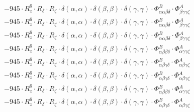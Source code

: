 \documentclass{article}
\begin{document}
\begin{subequations}
\begin{gather}
\begin{array}{c}
 \\[0.2em] 		 - 945 \cdot R_{z}^{6} \cdot R_{\delta{}} \cdot R_{\zeta{}} \cdot \delta{}\left(\alpha{}, \alpha{}\right) \cdot \delta{}\left(\beta{}, \beta{}\right) \cdot \delta{}\left(\gamma{}, \gamma{}\right) \cdot \Phi{}^{B}_{\alpha{}\alpha{}\beta{}\delta{}} \cdot \Phi{}^{A}_{\beta{}\gamma{}\gamma{}\zeta{}} 
 \\[0.2em] 		 - 945 \cdot R_{z}^{6} \cdot R_{\delta{}} \cdot R_{\zeta{}} \cdot \delta{}\left(\alpha{}, \alpha{}\right) \cdot \delta{}\left(\beta{}, \beta{}\right) \cdot \delta{}\left(\gamma{}, \gamma{}\right) \cdot \Phi{}^{B}_{\alpha{}\alpha{}\beta{}\delta{}} \cdot \Phi{}^{A}_{\beta{}\gamma{}\gamma{}\zeta{}} 
 \\[0.2em] 		 - 945 \cdot R_{z}^{6} \cdot R_{\delta{}} \cdot R_{\zeta{}} \cdot \delta{}\left(\alpha{}, \alpha{}\right) \cdot \delta{}\left(\beta{}, \beta{}\right) \cdot \delta{}\left(\gamma{}, \gamma{}\right) \cdot \Phi{}^{B}_{\alpha{}\alpha{}\beta{}\delta{}} \cdot \Phi{}^{A}_{\beta{}\gamma{}\gamma{}\zeta{}} 
 \\[0.2em] 		 - 945 \cdot R_{z}^{6} \cdot R_{\delta{}} \cdot R_{\zeta{}} \cdot \delta{}\left(\alpha{}, \alpha{}\right) \cdot \delta{}\left(\beta{}, \beta{}\right) \cdot \delta{}\left(\gamma{}, \gamma{}\right) \cdot \Phi{}^{B}_{\alpha{}\beta{}\beta{}\delta{}} \cdot \Phi{}^{A}_{\alpha{}\gamma{}\gamma{}\zeta{}} 
 \\[0.2em] 		 - 945 \cdot R_{z}^{6} \cdot R_{\delta{}} \cdot R_{\zeta{}} \cdot \delta{}\left(\alpha{}, \alpha{}\right) \cdot \delta{}\left(\beta{}, \beta{}\right) \cdot \delta{}\left(\gamma{}, \gamma{}\right) \cdot \Phi{}^{B}_{\alpha{}\beta{}\gamma{}\delta{}} \cdot \Phi{}^{A}_{\alpha{}\beta{}\gamma{}\zeta{}} 
 \\[0.2em] 		 - 945 \cdot R_{z}^{6} \cdot R_{\delta{}} \cdot R_{\zeta{}} \cdot \delta{}\left(\alpha{}, \alpha{}\right) \cdot \delta{}\left(\beta{}, \beta{}\right) \cdot \delta{}\left(\gamma{}, \gamma{}\right) \cdot \Phi{}^{B}_{\alpha{}\beta{}\gamma{}\delta{}} \cdot \Phi{}^{A}_{\alpha{}\beta{}\gamma{}\zeta{}} 
 \\[0.2em] 		 - 945 \cdot R_{z}^{6} \cdot R_{\delta{}} \cdot R_{\zeta{}} \cdot \delta{}\left(\alpha{}, \alpha{}\right) \cdot \delta{}\left(\beta{}, \beta{}\right) \cdot \delta{}\left(\gamma{}, \gamma{}\right) \cdot \Phi{}^{B}_{\alpha{}\beta{}\beta{}\delta{}} \cdot \Phi{}^{A}_{\alpha{}\gamma{}\gamma{}\zeta{}} 
 \\[0.2em] 		 - 945 \cdot R_{z}^{6} \cdot R_{\delta{}} \cdot R_{\zeta{}} \cdot \delta{}\left(\alpha{}, \alpha{}\right) \cdot \delta{}\left(\beta{}, \beta{}\right) \cdot \delta{}\left(\gamma{}, \gamma{}\right) \cdot \Phi{}^{B}_{\alpha{}\beta{}\gamma{}\delta{}} \cdot \Phi{}^{A}_{\alpha{}\beta{}\gamma{}\zeta{}} 

\end{array}
\end{gather}
\end{subequations}
\end{document}
